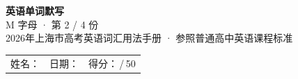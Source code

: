 \documentclass[10pt,a4paper]{article}
\begin{document}
\pagestyle{plain}

\begin{center}
{\LARGE\bfseries 英语单词默写}\\[0.22em]
{\large M 字母 · 第 2 / 4 份}\\[0.18em]
{\small 2026年上海市高考英语词汇用法手册 · 参照普通高中英语课程标准}
\end{center}

\vspace{0.25em}
\noindent\begin{tabular}{@{}p{}@{}p{}@{}p{}@{}}
姓名：\underline{\hspace{2.0cm}} & 日期：\underline{\hspace{2.0cm}} & 得分：\underline{\hspace{1.3cm}}\,/\,50 \\
\end{tabular}

\vspace{0.3em}

\vspace{0.08em}
\end{document}
